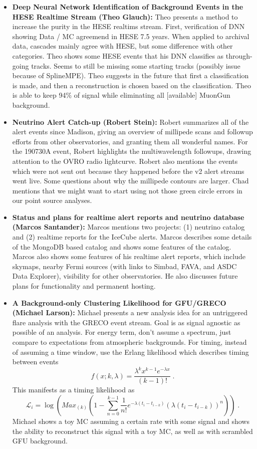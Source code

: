 \begin{itemize}
    \item \textbf{Deep Neural Network Identification of Background Events in the HESE Realtime Stream (Theo Glauch):} Theo presents a method to increase the purity in the HESE realtims stream. First, verification of DNN showing Data / MC agreemend in HESE 7.5 years. When applied to archival data, cascades mainly agree with HESE, but some difference with other categories. Theo shows some HESE events that his DNN classifies as through-going tracks. Seems to still be missing some starting tracks (possibly issue because of SplineMPE). Theo suggests in the future that first a classification is made, and then a reconstruction is chosen based on the classification. Theo is able to keep 94\% of signal while eliminating all [available] MuonGun background.
    \item \textbf{Neutrino Alert Catch-up (Robert Stein):} Robert summarizes all of the alert events since Madison, giving an overview of millipede scans and followup efforts from other observatories, and granting them all wonderful names. For the 190730A event, Robert highlights the multiwavelength followups, drawing attention to the OVRO radio lightcurve. Robert also mentions the events which were not sent out because they happened before the v2 alert streams went live. Some questions about why the millipede contours are larger. Chad mentions that we might want to start using not those green circle errors in our point source analyses. 
    \item \textbf{Status and plans for realtime alert reports and neutrino database (Marcos Santander):} Marcos mentions two projects: (1) neutrino catalog and (2) realtime reports for the IceCube alerts. Marcos describes some details of the MongoDB based catalog and shows some features of the catalog. Marcos also shows some features of his realtime alert reports, which include skymaps, nearby Fermi sources (with links to Simbad, FAVA,  and ASDC Data Explorer), visibility for other observatories. He also discusses future plans for functionality and permanent hosting. 
    \item \textbf{A Background-only Clustering Likelihood for GFU/GRECO (Michael Larson):} Michael presents a new analysis idea for an untriggered flare analysis with the GRECO event stream. Goal is as signal agnostic as possible of an analysis. For energy term, don't assume a spectrum, just compare to expectations from atmospheric backgrounds. For timing, instead of assuming a time window, use the Erlang likelihood which describes timing between events $$ f(x ; k, \lambda)=\frac{\lambda^{k} x^{k-1} e^{-\lambda x}}{(k-1) !} \;.$$ This manifests as a timing likelihood as $$ \mathcal{L}_{i}=\log \left(M a x_{(k)}\left(1-\sum_{n=0}^{k-1} \frac{1}{n !} e^{-\lambda\left(t_{i}-t_{i-k}\right)}\left(\lambda\left(t_{i}-t_{i-k}\right)\right)^{n}\right)\right) \;.$$ Michael shows a toy MC assuming a certain rate with some signal and shows the ability to reconstruct this signal with a toy MC, as well as with scrambled GFU background. 
\end{itemize}

